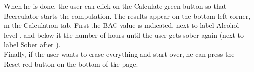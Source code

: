 When he is done, the user can click on the \guillemotleft{} Calculate \guillemotright{} green button so that Beerculator starts the computation. The results appear on the bottom left corner, in the \guillemotleft{} Calculation \guillemotright{} tab. First the BAC value is indicated, next to label \guillemotleft{} Alcohol level \guillemotright{} , and below it the number of hours until the user gets sober again (next to label \guillemotleft{} Sober after \guillemotright{}).\\

Finally, if the user wants to erase everything and start over, he can press the \guillemotleft{} Reset \guillemotright{} red button on the bottom of the page.
